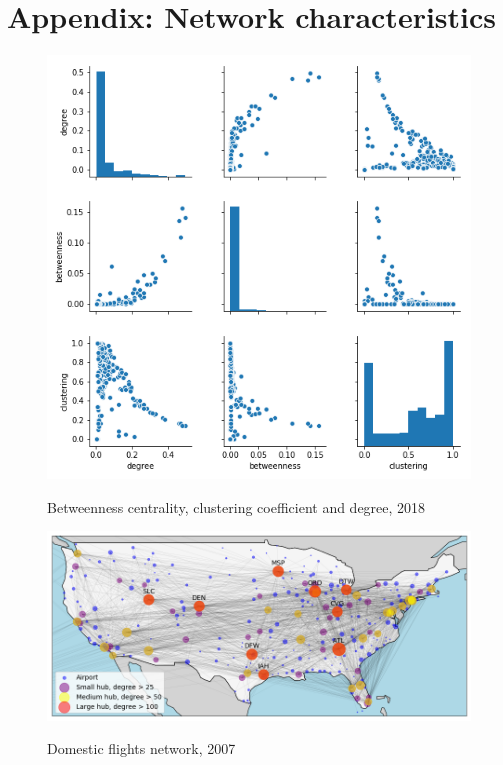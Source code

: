 \section{Appendix: Network characteristics}
\label{app: Network characteristics}
\begin{figure}[H]
  \centering
  \caption{Betweenness centrality, clustering coefficient and degree, 2018}
    \includegraphics[width=1 \textwidth]{Exam/Figures/NxPairPlot.png}
  \label{fig:Btwns_CC}
\end{figure}

\begin{figure}[H]
  \centering
  \caption{Domestic flights network, 2007}
    \includegraphics[width=1. \textwidth]{Exam/Figures/map_general_07}
    \vspace{-0.7cm}
  \label{fig:map_general_07}
\end{figure}